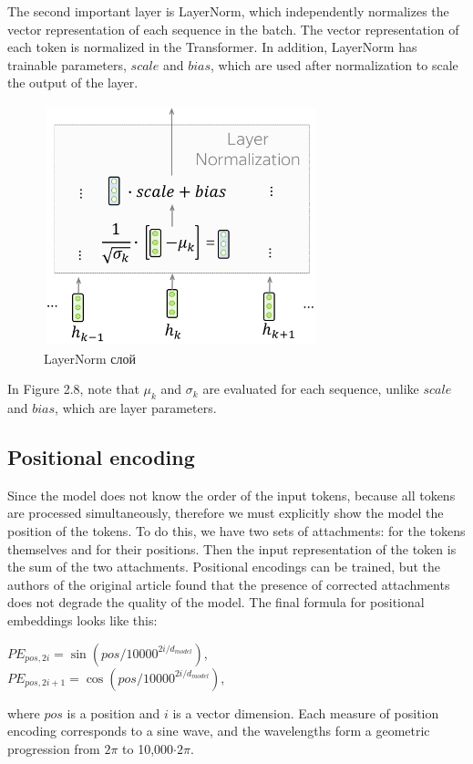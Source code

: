 \documentclass[PMI,VKR]{HSEUniversity}
\begin{document}
The second important layer is LayerNorm, which independently normalizes the vector representation of each sequence in the batch. 
The vector representation of each token is normalized in the Transformer. In addition, LayerNorm has trainable parameters, $scale$ and $bias$, which are used after normalization to scale the output of the layer.

\begin{figure}[h]
    \centering
    \includegraphics[scale=1]{img/layer_norm.png}
    \caption{LayerNorm слой}
\end{figure}

In Figure 2.8, note that $\mu_{k}$ and $\sigma_{k}$ are evaluated for each sequence, unlike $scale$ and $bias$, which are layer parameters.

\subsection{Positional encoding}

Since the model does not know the order of the input tokens, because all tokens are processed simultaneously, therefore we must explicitly show the model the position of the tokens. 
To do this, we have two sets of attachments: for the tokens themselves and for their positions. 
Then the input representation of the token is the sum of the two attachments.
Positional encodings can be trained, but the authors of the original article found that the presence of corrected attachments does not degrade the quality of the model. The final formula for positional embeddings looks like this:

\begin{center}
    $PE_{pos,2i} = \sin(pos/10000^{2i/d_{model}})$, \\
    $PE_{pos,2i+1} = \cos(pos/10000^{2i/d_{model}})$, \\
\end{center}
where $pos$ is a position and $i$ is a vector dimension. Each measure of position encoding corresponds to a sine wave, and the wavelengths form a geometric progression from $2\pi$ to 10,000$\cdot 2\pi$.
\end{document}

